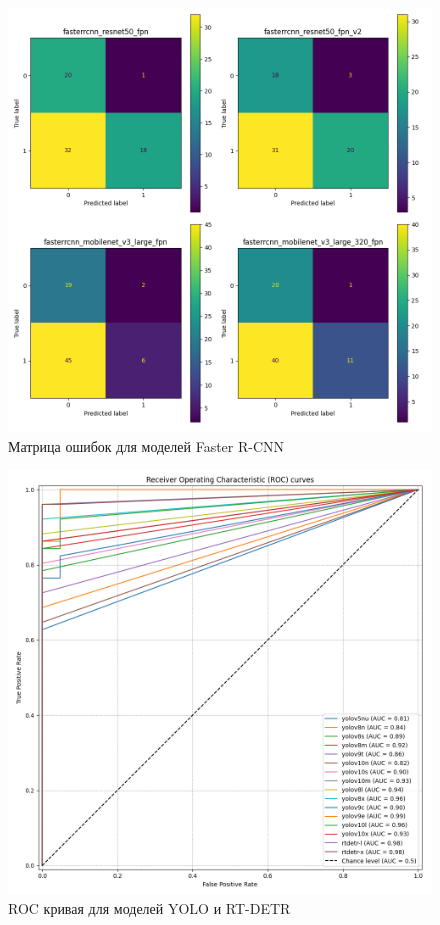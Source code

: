 \documentclass[../document.tex]{subfiles}
\begin{document}
 		\begin{figure}[H]
 			\centering
 			\includegraphics[scale=0.4]{RCNN_ConfMat.png}
 			\caption{Матрица ошибок для моделей Faster R-CNN}
 		\end{figure}
 		\begin{figure}[H]
 			\centering
 			\includegraphics[scale=0.4]{roc_curve.png}
 			\caption{ROC кривая для моделей YOLO и RT-DETR}
 		\end{figure}
\end{document}
